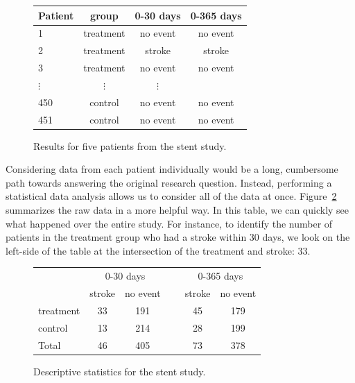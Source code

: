 \begin{figure}[h]
\centering
\begin{tabular}{l ccc}
\hline
Patient	&	group	&	0-30 days 	&	0-365 days \\
\hline
1		&	treatment &	no event &	no event \\
2		&	treatment &	stroke & stroke \\
3		&	treatment &	no event & no event \\
$\vdots$	&	$\vdots$	  &	$\vdots$ \\
450	&	control &	no event &	no event \\
451	&	control &	no event &	no event \\
\hline
\end{tabular}
\caption{Results for five patients from the stent study.}
\label{stentStudyResultsDF}
\end{figure}

Considering data from each patient individually would be a long, cumbersome path towards answering the original research question. Instead, performing a statistical data analysis allows us to consider all of the data at once. Figure~\ref{stentStudyResults} summarizes the raw data in a more helpful way. In this table, we can quickly see what happened over the entire study. For instance, to identify the number of patients in the treatment group who had a stroke within 30 days, we look on the left-side of the table at the intersection of the treatment and stroke: 33.

\begin{figure}[h]
\centering
\begin{tabular}{l cc c cc}
& \multicolumn{2}{c}{0-30 days} &\hspace{5mm}\ & \multicolumn{2}{c}{0-365 days} \\
  \cline{2-3} \cline{5-6}
	& 	stroke 	& no event && 	stroke 	& no event \\
  \hline
treatment 	& 33		& 191	&&	45 	& 179 \\
control 		& 13		& 214	&& 	28	& 199 \\
  \hline
Total				& 46		& 405	&&	73	& 378 \\
  \hline
\end{tabular}
\caption{Descriptive statistics for the stent study.}
\label{stentStudyResults}
\end{figure}


